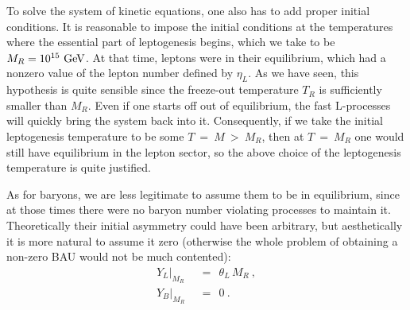 \documentclass[12pt]{revtex4}
\newcommand{\GeV}{{\rm GeV}}
\begin{document}
	To solve the system of kinetic equations, one also has to 
	add proper initial conditions.
	It is reasonable to impose the initial conditions at the temperatures
	where the essential part of leptogenesis begins, which we
	take to be $ M_R = 10^{15}~\GeV $.
	At that time, leptons were in their equilibrium, which
	had a nonzero value of the lepton number defined by $ \eta_L $.
	As we have seen, this hypothesis is quite sensible since 
	the freeze-out temperature $ T_R $ is sufficiently smaller than
	$ M_R $.
	Even if one starts off out of equilibrium, the fast L-processes
	will quickly bring the system back into it.
	Consequently, if we take the initial leptogenesis temperature
	to be some $ T ~=~ M ~>~ M_R $, then at $ T~=~M_R $ one would
	still have equilibrium in the lepton sector, so the above
	choice of the leptogenesis temperature is quite justified.

	As for baryons, we are less legitimate to assume them to be in
	equilibrium, since at those times there were no baryon number
	violating processes to maintain it.
	Theoretically their initial asymmetry could have been arbitrary,
	but aesthetically it is more natural to assume it zero
	(otherwise the whole problem of obtaining a non-zero BAU would
	not be much contented):
\begin{align*}
	Y_L\bigl|_{M_R} & ~~=~~ \theta_L\, M_R~, \\
	Y_B\bigl|_{M_R} & ~~=~~ 0~.
\end{align*}
	
\end{document}
